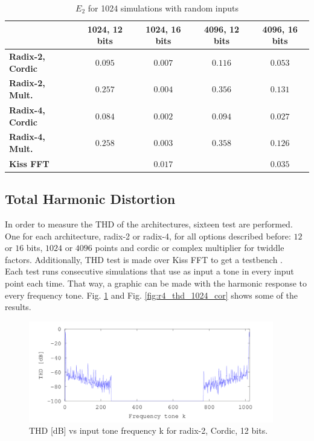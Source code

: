 \documentclass[conference]{IEEEtran}
\begin{document}
\begin{table}[htb!]
\caption{$E_2$ for 1024 simulations with random inputs}
\begin{tabular}{l c c c c }
 & \textbf{1024, 12 bits} & \textbf{1024, 16 bits} & \textbf{4096, 12 bits} & \textbf{4096, 16 bits}\\ \hline 
\textbf{Radix-2, Cordic} & $0.095$ & $0.007$ & $0.116$ & $0.053$\\
\textbf{Radix-2, Mult.} & $0.257$ & $0.004$ & $0.356$ & $0.131$\\
\textbf{Radix-4, Cordic} & $0.084$ & $0.002$ & $0.094$ & $0.027$\\
\textbf{Radix-4, Mult.} & $0.258$ & $0.003$ & $0.358$ & $0.126$\\ 
\textbf{Kiss FFT} & $ $ & $0.017$ & $ $ & $0.035$\\\hline
\end{tabular}
\label{table:error2}
\end{table}
 

\subsection{Total Harmonic Distortion}

In order to measure the THD of the architectures, sixteen test are performed. One for each architecture, radix-2 or radix-4, for all options 
described before: $12$ or $16$ bits, $1024$ or $4096$ points and cordic or complex multiplier for twiddle factors. Additionally, THD test is made 
over Kiss FFT to get a testbench \cite{KISSFFT}.\\
Each test runs consecutive simulations that use as input a tone in every input point each time. That way, a graphic can be made with 
the harmonic response to every frequency tone. Fig. \ref{fig:r2_thd_1024_cor} and Fig. \ref{fig:r4_thd_1024_cor} shows some of the 
results.\\

\begin{figure}[h!]
        \centering
        \includegraphics[width=10.7cm]{./figures/thd3.png}
        \caption{THD [dB] vs input tone frequency k for radix-2, Cordic, 12 bits.}
        \label{fig:r2_thd_1024_cor}
\end{figure}
\end{document}
